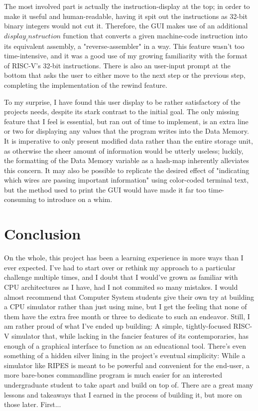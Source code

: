 \documentclass[12pt,twoside]{reedthesis}
\begin{document}
The most involved part is actually the instruction-display at the top; in order to make it useful and human-readable, having it spit out the instructions as 32-bit binary integers would not cut it. Therefore, the GUI makes use of an additional $display_instruction$ function that converts a given machine-code instruction into its equivalent assembly, a "reverse-assembler" in a way. This feature wasn't too time-intensive, and it was a good use of my growing familiarity with the format of RISC-V's 32-bit instructions.
There is also an user-input prompt at the bottom that asks the user to either move to the next step or the previous step, completing the implementation of the rewind feature.

To my surprise, I have found this user display to be rather satisfactory of the projects needs, despite its stark contrast to the initial goal. The only missing feature that I feel is essential, but ran out of time to implement, is an extra line or two for displaying any values that the program writes into the Data Memory. It is imperative to only present modified data rather than the entire storage unit, as otherwise the sheer amount of information would be utterly useless; luckily, the formatting of the Data Memory variable as a hash-map inherently alleviates this concern. It may also be possible to replicate the desired effect of "indicating which wires are passing important information" using color-coded terminal text, but the method used to print the GUI would have made it far too time-consuming to introduce on a whim.


\chapter{Conclusion}

On the whole, this project has been a learning experience in more ways than I ever expected. I've had to start over or rethink my approach to a particular challenge multiple times, and I doubt that I would've grown as familiar with CPU architectures as I have, had I not commited so many mistakes. I would almost recommend that Computer System students give their own try at building a CPU simulator rather than just using mine, but I get the feeling that none of them have the extra free month or three to dedicate to such an endeavor. Still, I am rather proud of what I've ended up building: A simple, tightly-focused RISC-V simulator that, while lacking in the fancier features of its contemporaries, has enough of a graphical interface to function as an educational tool. There's even something of a hidden silver lining in the project's eventual simplicity: While a simulator like RIPES is meant to be powerful and convenient for the end-user, a more bare-bones commandline program is much easier for an interested undergraduate student to take apart and build on top of. There are a great many lessons and takeaways that I earned in the process of building it, but more on those later. First...
\end{document}
